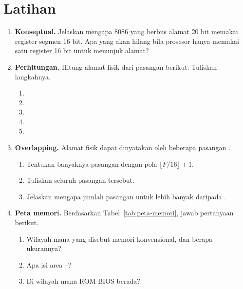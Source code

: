 \section{Latihan}
\label{sec:latihan-bab6}

\begin{enumerate}
    \item \textbf{Konseptual.} Jelaskan mengapa 8086 yang berbus
          alamat 20 bit memakai register segmen 16 bit. Apa yang
          akan hilang bila prosesor hanya memakai satu register
          16 bit untuk menunjuk alamat?

    \item \textbf{Perhitungan.} Hitung alamat fisik dari pasangan
          berikut. Tuliskan langkahnya.
          \begin{enumerate}
              \item {}
              \item {}
              \item {}
              \item {}
              \item {}
          \end{enumerate}

    \item \textbf{Overlapping.} Alamat fisik  dapat
          dinyatakan oleh beberapa pasangan .
          \begin{enumerate}
              \item Tentukan banyaknya pasangan dengan pola
                    $\lfloor F/16 \rfloor + 1$.
              \item Tuliskan seluruh pasangan tersebut.
              \item Jelaskan mengapa jumlah pasangan untuk
                     lebih banyak daripada .
          \end{enumerate}

    \item \textbf{Peta memori.} Berdasarkan
          Tabel~\ref{tab:peta-memori}, jawab pertanyaan berikut.
          \begin{enumerate}
              \item Wilayah mana yang disebut memori konvensional,
                    dan berapa ukurannya?
              \item Apa isi area --?
              \item Di wilayah mana ROM BIOS berada?
          \end{enumerate}


\end{enumerate}
